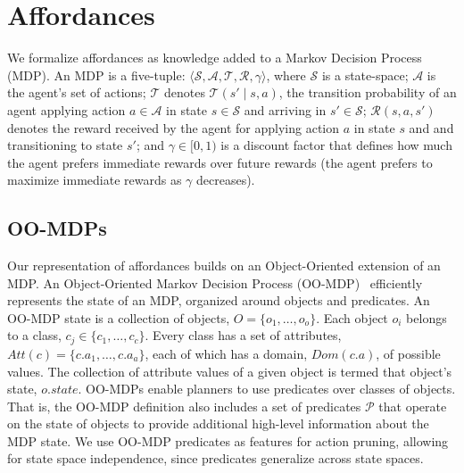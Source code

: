 \documentclass[conference]{IEEEtran}
\begin{document}

\section{Affordances}
\label{sec:affordances}

We formalize affordances as knowledge added to a Markov Decision Process
(MDP).  An MDP is a five-tuple: $\langle \mathcal{S}, \mathcal{A},
\mathcal{T}, \mathcal{R}, \gamma \rangle$, where $\mathcal{S}$ is a
state-space; $\mathcal{A}$ is the agent's set of actions;
$\mathcal{T}$ denotes $\mathcal{T}(s' \mid s,a)$, the transition
probability of an agent applying action $a \in \mathcal{A}$ in state
$s \in \mathcal{S}$ and arriving in $s' \in \mathcal{S}$;
$\mathcal{R}(s,a,s')$ denotes the reward received by the agent for
applying action $a$ in state $s$ and and transitioning to state $s'$;
and $\gamma \in [0, 1)$ is a discount factor that defines how much the
agent prefers immediate rewards over future rewards (the agent
prefers to maximize immediate rewards as $\gamma$ decreases).

\subsection{OO-MDPs}
Our representation of affordances builds on an Object-Oriented extension of an MDP.
An Object-Oriented Markov Decision Process (OO-MDP)~\citep{diuk08}
efficiently represents the state of an MDP, organized around objects
and predicates.  An OO-MDP state is a collection of
objects, $O = \{o_1, \ldots, o_o \}$.  Each object $o_i$ belongs to a
class, $c_j \in \{c_1, \ldots, c_c\}$. Every class has a set of
attributes, $Att(c) = \{c.a_1, \ldots, c.a_a \}$, each of which has a
domain, $Dom(c.a)$, of possible values. The collection of attribute
values of a given object is termed that object's state, $o.state$. OO-MDPs
enable planners to use predicates over classes of objects. That is, the OO-MDP
definition also includes a set of predicates $\mathcal{P}$ that operate
on the state of objects to provide additional high-level information
about the MDP state. We use OO-MDP predicates as features for action
pruning, allowing for state space independence, since predicates
generalize across state spaces.
\end{document}
